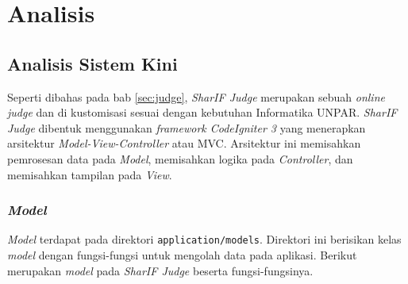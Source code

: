 \chapter{Analisis}
\label{chap:analisis}
\section{Analisis Sistem Kini}
Seperti dibahas pada bab \ref{sec:judge}, \textit{SharIF Judge} merupakan sebuah \textit{online judge} dan di kustomisasi sesuai dengan kebutuhan Informatika UNPAR. \textit{SharIF Judge} dibentuk menggunakan \textit{framework CodeIgniter 3} yang menerapkan  arsitektur \textit{Model-View-Controller} atau MVC. Arsitektur ini memisahkan pemrosesan data pada \textit{Model}, memisahkan logika pada \textit{Controller}, dan memisahkan tampilan pada \textit{View}.

\subsection{\textit{Model}}
\textit{Model} terdapat pada direktori \texttt{application/models}. Direktori ini berisikan kelas \textit{model} dengan fungsi-fungsi untuk mengolah data pada aplikasi. Berikut merupakan \textit{model} pada \textit{SharIF Judge} beserta fungsi-fungsinya.
